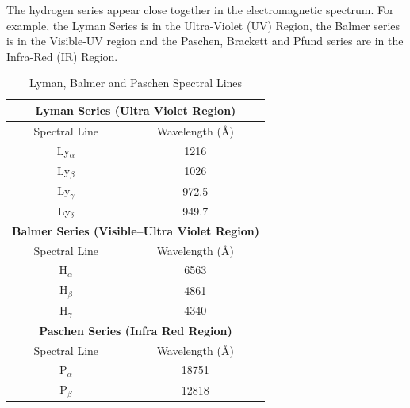 \documentclass[a4paper]{IEEEtran}
\begin{document}
    The hydrogen series appear close together in the electromagnetic spectrum.
    For example, the Lyman Series is in the Ultra-Violet (UV) Region, the Balmer
    series is in the Visible-UV region and the Paschen, Brackett and Pfund series
    are in the Infra-Red (IR) Region.

     \begin{table}
        \centering
        \caption{Lyman, Balmer and Paschen Spectral Lines} 
        \label{tbl:spectral-lines} 
        \centering
        \begin{tabular}{cc} \hline 
            \multicolumn{2}{c}{\bf Lyman Series (Ultra Violet Region)} \\ \hline 
            Spectral Line & Wavelength (\AA) \\ \hline 
            Ly$_{\alpha}$     &   1216    \\ 
            Ly$_{\beta}$      &   1026    \\ 
            Ly$_{\gamma}$     &   972.5   \\
            Ly$_{\delta}$    &   949.7   \\ \hline 

            \multicolumn{2}{c}{\bf Balmer Series (Visible--Ultra Violet Region)} \\ \hline 
            Spectral Line & Wavelength (\AA) \\ \hline 
            H$_{\alpha}$     &   6563    \\ 
            H$_{\beta}$      &   4861    \\ 
            H$_{\gamma}$     &   4340   \\ \hline 

            \multicolumn{2}{c}{\bf Paschen Series (Infra Red Region)} \\ \hline 
            Spectral Line & Wavelength (\AA) \\ \hline 
            P$_{\alpha}$     &   18751    \\ 
            P$_{\beta}$      &   12818    \\  \hline


        \end{tabular}
    \end{table} 


\end{document}
